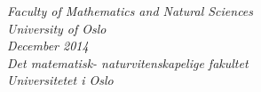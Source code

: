 \begin{center}
  \vspace{5mm}
  \textsl{Faculty of Mathematics and Natural Sciences} \\
  \textsl{University of Oslo} \\
  \vspace{5mm}
  \large
  \textsl{December 2014} \\
  \vspace{5mm}
  \normalsize
  \textsl{Det matematisk- naturvitenskapelige fakultet} \\
  \textsl{Universitetet i Oslo} \\
\end{center}
%

